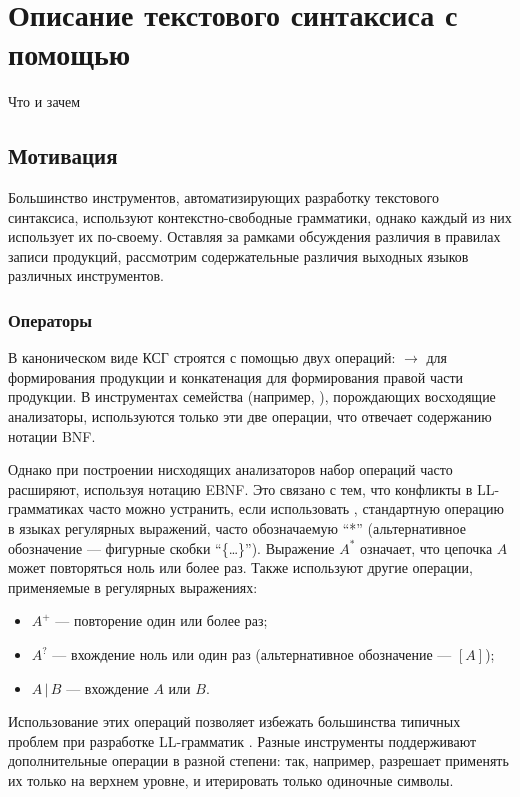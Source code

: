 \part{Описание текстового синтаксиса с помощью }

Что и зачем

\chapter{Мотивация}

Большинство инструментов, автоматизирующих разработку текстового синтаксиса, используют контекстно-свободные грамматики, однако каждый из них использует их по-своему. Оставляя за рамками обсуждения различия в правилах записи продукций, рассмотрим содержательные различия выходных языков различных инструментов.

\section{Операторы}

В каноническом виде КСГ строятся с помощью двух операций: $\rightarrow$ для формирования продукции и конкатенация для формирования правой части продукции. В инструментах семейства  (например, \cite{???}), порождающих восходящие анализаторы, используются только эти две операции, что отвечает содержанию нотации BNF.

Однако при построении нисходящих анализаторов набор операций часто расширяют, используя нотацию EBNF. Это связано с тем, что конфликты в LL-грамматиках часто можно устранить, если использовать , стандартную операцию в языках регулярных выражений, часто обозначаемую ``*'' (альтернативное обозначение --- фигурные скобки ``\{\ldots\}''). Выражение $A^*$ означает, что цепочка $A$ может повторяться ноль или более раз. Также используют другие операции, применяемые в регулярных выражениях:
\begin{itemize}
\item $A^+$ --- повторение один или более раз;
\item $A^?$ --- вхождение ноль или один раз (альтернативное обозначение --- $[A]$);
\item $A\,|\,B$ --- вхождение $A$ или $B$.
\end{itemize}
Использование этих операций позволяет избежать большинства типичных проблем при разработке LL-грамматик \cite{???}. Разные инструменты поддерживают дополнительные операции в разной степени: так, например,  \cite{???} разрешает применять их только на верхнем уровне, и итерировать только одиночные символы.

